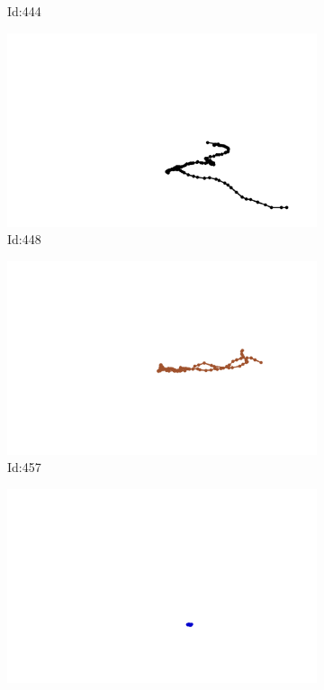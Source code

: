 \documentclass[12pt,twoside]{report}
\begin{document}
\begin{figure}
\begin{subfigure}[b]{0.20\textwidth}
\caption{Id:444}
\end{subfigure}
\begin{subfigure}[b]{0.20\textwidth}
\centering
\includegraphics[width=\textwidth]{../trajectories/448.png}
\caption{Id:448}
\end{subfigure}
\begin{subfigure}[b]{0.20\textwidth}
\centering
\includegraphics[width=\textwidth]{../trajectories/457.png}
\caption{Id:457}
\end{subfigure}
\begin{subfigure}[b]{0.20\textwidth}
\centering
\includegraphics[width=\textwidth]{../trajectories/658.png}

\end{subfigure}
\end{figure}
\end{document}

